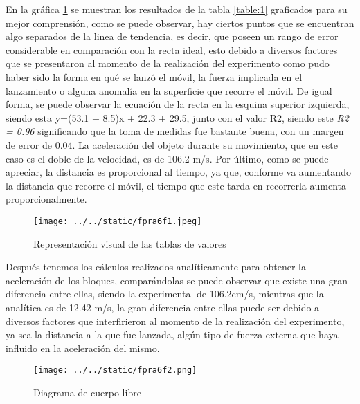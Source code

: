 \documentclass{article}
\begin{document}
En la gráfica \ref{fig:1} se muestran los resultados de la tabla \ref{table:1} graficados para su mejor comprensión, como se puede observar, hay ciertos puntos que se encuentran algo separados de la linea de tendencia, es decir, que poseen un rango de error considerable en comparación con la recta ideal, esto debido a diversos factores que se presentaron al momento de la realización del experimento como pudo haber sido la forma en qué se lanzó el móvil, la fuerza implicada en el lanzamiento o alguna anomalía en la superficie que recorre el móvil. De igual forma, se puede observar la ecuación de la recta en la esquina superior izquierda, siendo esta y=(53.1 $\pm$ 8.5)x + 22.3 $\pm$ 29.5, junto con el valor R2, siendo este \emph{R2 = 0.96 }significando que la toma de medidas fue bastante buena, con un margen de error de 0.04. La aceleración del objeto durante su movimiento, que en este caso es el doble de la velocidad, es de 106.2 m/s. Por último, como se puede apreciar, la distancia es proporcional al tiempo, ya que, conforme va aumentando la distancia que recorre el móvil, el tiempo que este tarda en recorrerla aumenta proporcionalmente.

\begin{figure}[H]
	\centering
	\texttt{[image: ../../static/fpra6f1.jpeg]}	
	\caption{Representación visual de las tablas de valores}
	\label{fig:1}
\end{figure}

Después tenemos los cálculos realizados analíticamente para obtener la aceleración de los bloques, comparándolas se puede observar que existe una gran diferencia entre ellas, siendo la experimental de 106.2cm/s, mientras que la analítica es de 12.42 m/s, la gran diferencia entre ellas puede ser debido a diversos factores que interfirieron al momento de la realización del experimento, ya sea la distancia a la que fue lanzada, algún tipo de fuerza externa que haya influido en la aceleración del mismo.

\begin{figure}[H]
	\centering
	\texttt{[image: ../../static/fpra6f2.png]}
	\caption{Diagrama de cuerpo libre}
	\label{fig:2}
\end{figure}
\end{document}
